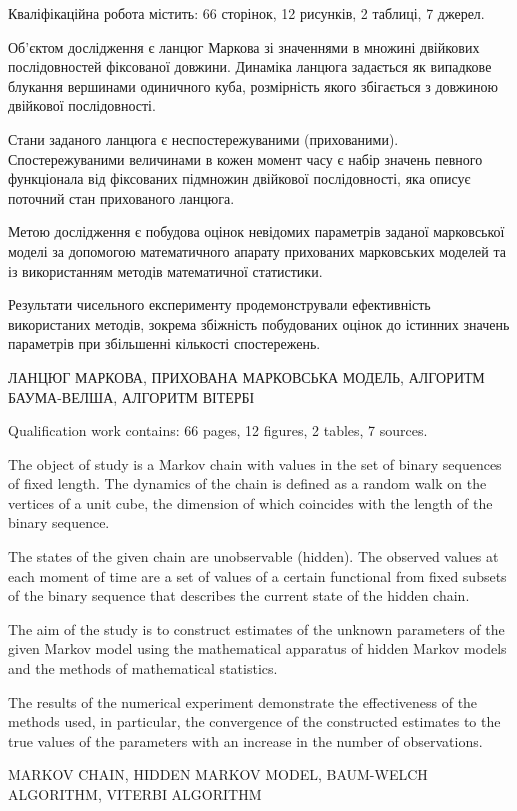 \abstractUkr

Кваліфікаційна робота містить: 66 сторінок, 12 рисунків, 2 таблиці, 7 джерел.

Об'єктом дослідження є ланцюг Маркова зі значеннями в множині двійкових послідовностей фіксованої довжини. Динаміка ланцюга задається як випадкове блукання вершинами одиничного куба, розмірність якого збігається з довжиною двійкової послідовності. 

Стани заданого ланцюга є неспостережуваними (прихованими). Спостережуваними величинами в кожен момент часу є набір значень певного функціонала від фіксованих підмножин двійкової послідовності, яка описує поточний стан прихованого ланцюга.

Метою дослідження є побудова оцінок невідомих параметрів заданої марковської моделі за допомогою математичного апарату прихованих марковських моделей та із використанням методів математичної статистики. 

Результати чисельного експерименту продемонстрували ефективність використаних методів, зокрема збіжність побудованих оцінок до істинних значень параметрів при збільшенні кількості спостережень.

\MakeUppercase{ЛАНЦЮГ МАРКОВА, ПРИХОВАНА МАРКОВСЬКА МОДЕЛЬ, АЛГОРИТМ БАУМА-ВЕЛША, АЛГОРИТМ ВІТЕРБІ}

\abstractEng

Qualification work contains: 66 pages, 12 figures, 2 tables, 7 sources.

The object of study is a Markov chain with values in the set of binary sequences of fixed length. The dynamics of the chain is defined as a random walk on the vertices of a unit cube, the dimension of which coincides with the length of the binary sequence. 

The states of the given chain are unobservable (hidden). The observed values at each moment of time are a set of values of a certain functional from fixed subsets of the binary sequence that describes the current state of the hidden chain.

The aim of the study is to construct estimates of the unknown parameters of the given Markov model using the mathematical apparatus of hidden Markov models and the methods of mathematical statistics. 

The results of the numerical experiment demonstrate the effectiveness of the methods used, in particular, the convergence of the constructed estimates to the true values of the parameters with an increase in the number of observations.

\MakeUppercase{MARKOV CHAIN, HIDDEN MARKOV MODEL, BAUM-WELCH ALGORITHM, VITERBI ALGORITHM}

\clearpage
